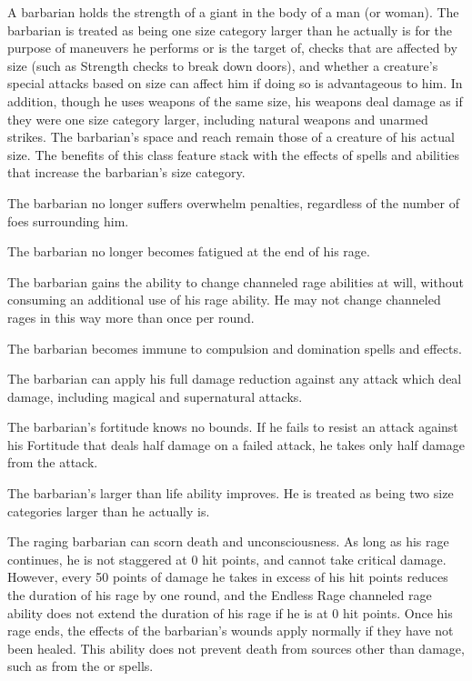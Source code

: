  A barbarian holds the strength of a giant in the body of a man (or woman). The barbarian is treated as being one size category larger than he actually is for the purpose of maneuvers he performs or is the target of, checks that are affected by size (such as Strength checks to break down doors), and whether a creature's special attacks based on size can affect him if doing so is advantageous to him. In addition, though he uses weapons of the same size, his weapons deal damage as if they were one size category larger, including natural weapons and unarmed strikes. The barbarian's space and reach remain those of a creature of his actual size. The benefits of this class feature stack with the effects of spells and abilities that increase the barbarian's size category.

 The barbarian no longer suffers overwhelm penalties, regardless of the number of foes surrounding him.

 The barbarian no longer becomes fatigued at the end of his rage.

 The barbarian gains the ability to change channeled rage abilities at will, without consuming an additional use of his rage ability. He may not change channeled rages in this way more than once per round.

 The barbarian becomes immune to compulsion and domination spells and effects.

 The barbarian can apply his full damage reduction against any attack which deal damage, including magical and supernatural attacks.

 The barbarian's fortitude knows no bounds. If he fails to resist an attack against his Fortitude that deals half damage on a failed attack, he takes only half damage from the attack.

 The barbarian's larger than life ability improves. He is treated as being two size categories larger than he actually is.

 The raging barbarian can scorn death and unconsciousness. As long as his rage continues, he is not staggered at 0 hit points, and cannot take critical damage. However, every 50 points of damage he takes in excess of his hit points reduces the duration of his rage by one round, and the Endless Rage channeled rage ability does not extend the duration of his rage if he is at 0 hit points. Once his rage ends, the effects of the barbarian's wounds apply normally if they have not been healed. This ability does not prevent death from sources other than damage, such as from the  or  spells.


